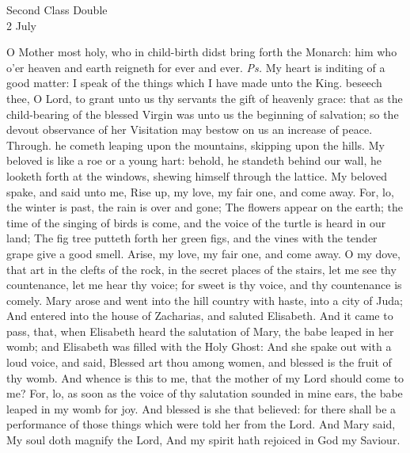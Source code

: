 \begin{inhead}
    {Second Class Double\\
2 July}
\end{inhead}

\introit
{} O Mother most holy, who in child-birth didst bring forth the Monarch: him who o'er heaven and earth reigneth for ever and ever. \textit{Ps.} My heart is inditing of a good matter: I speak of the things which I have made unto the King.
\collect
{} beseech thee, O Lord, to grant unto us thy servants the gift of heavenly grace: that as the child-bearing of the blessed Virgin was unto us the beginning of salvation; so the devout observance of her Visitation may bestow on us an increase of peace. Through.
 he cometh leaping upon the mountains, skipping upon the hills. My beloved is like a roe or a young hart: behold, he standeth behind our wall, he looketh forth at the windows, shewing himself through the lattice. My beloved spake, and said unto me, Rise up, my love, my fair one, and come away. For, lo, the winter is past, the rain is over and gone; The flowers appear on the earth; the time of the singing of birds is come, and the voice of the turtle is heard in our land; The fig tree putteth forth her green figs, and the vines with the tender grape give a good smell. Arise, my love, my fair one, and come away. O my dove, that art in the clefts of the rock, in the secret places of the stairs, let me see thy countenance, let me hear thy voice; for sweet is thy voice, and thy countenance is comely.
 Mary arose and went into the hill country with haste, into a city of Juda; And entered into the house of Zacharias, and saluted Elisabeth. And it came to pass, that, when Elisabeth heard the salutation of Mary, the babe leaped in her womb; and Elisabeth was filled with the Holy Ghost: And she spake out with a loud voice, and said, Blessed art thou among women, and blessed is the fruit of thy womb. And whence is this to me, that the mother of my Lord should come to me? For, lo, as soon as the voice of thy salutation sounded in mine ears, the babe leaped in my womb for joy. And blessed is she that believed: for there shall be a performance of those things which were told her from the Lord. And Mary said, My soul doth magnify the Lord, And my spirit hath rejoiced in God my Saviour.
